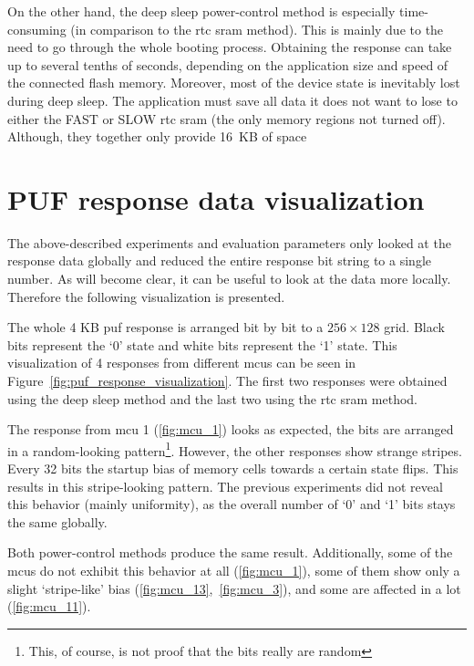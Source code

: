 On the other hand, the deep sleep power-control method is especially time-consuming (in comparison to the \gls{rtc} \gls{sram} method). This is mainly due to the need to go through the whole booting process. Obtaining the response can take up to several tenths of seconds, depending on the application size and speed of the connected flash memory. Moreover, most of the device state is inevitably lost during deep sleep. The application must save all data it does not want to lose to either the FAST or SLOW \gls{rtc} \gls{sram} (the only memory regions not turned off). Although, they together only provide 16~KB of space

\section{PUF response data visualization}

The above-described experiments and evaluation parameters only looked at the response data globally and reduced the entire response bit string to a single number. As will become clear, it can be useful to look at the data more locally. Therefore the following visualization is presented.

The whole 4 KB \gls{puf} response is arranged bit by bit to a $256 \times 128$ grid. Black bits represent the `0' state and white bits represent the `1' state. This visualization of 4 responses from different \glspl{mcu} can be seen in Figure~\ref{fig:puf_response_visualization}. The first two responses were obtained using the deep sleep method and the last two using the \gls{rtc} \gls{sram} method.

The response from \gls{mcu} 1 (\ref{fig:mcu_1}) looks as expected, the bits are arranged in a random-looking pattern\footnote{This, of course, is not proof that the bits really are random}. However, the other responses show strange stripes. Every 32 bits the startup bias of memory cells towards a certain state flips. This results in this stripe-looking pattern. The previous experiments did not reveal this behavior (mainly uniformity), as the overall number of  `0' and `1' bits stays the same globally.

Both power-control methods produce the same result. Additionally, some of the \glspl{mcu} do not exhibit this behavior at all (\ref{fig:mcu_1}), some of them show only a slight `stripe-like' bias (\ref{fig:mcu_13},~\ref{fig:mcu_3}), and some are affected in a lot (\ref{fig:mcu_11}).

